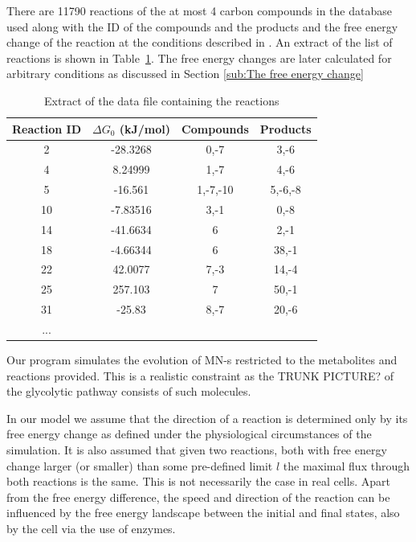 \documentclass[a4paper,12pt]{article}
\begin{document}
	There are 11790 reactions of the at most 4 carbon compounds in the database used along with the ID of the compounds and the products and the free energy change of the reaction at the conditions described in \cite{BartekLower}. An extract of the list of reactions is shown in Table~\ref{tab:reacs}. The free energy changes are later calculated for arbitrary conditions as discussed in Section \ref{sub:The free energy change}

	\begin{table}[htpb]
		\centering
		\begin{tabular}{cccc}
		Reaction ID &	$\Delta G_0$ (kJ/mol) & Compounds & Products \\ \hline
		2 &	-28.3268           & 0,-7      & 3,-6     \\
		4 &	8.24999            & 1,-7      & 4,-6     \\
		5 &	-16.561            & 1,-7,-10  & 5,-6,-8  \\
		10 &	-7.83516           & 3,-1      & 0,-8     \\
		14 &	-41.6634           & 6         & 2,-1     \\
		18 &	-4.66344           & 6         & 38,-1    \\
		22 &	42.0077            & 7,-3      & 14,-4    \\
		25 &	257.103            & 7         & 50,-1    \\
		31 &	-25.83             & 8,-7      & 20,-6    \\
		...&           &         
		\end{tabular}
		\caption{Extract of the data file containing the reactions}
		\label{tab:reacs}
	\end{table}
	
	Our program simulates the evolution of MN-s restricted to the metabolites and reactions provided. This is a realistic constraint as the TRUNK PICTURE? of the glycolytic pathway consists of such molecules.

	In our model we assume that the direction of a reaction is determined only by its free energy change as defined under the physiological circumstances of the simulation. It is also assumed that given two reactions, both with free energy change larger (or smaller) than some pre-defined limit $l$ the maximal flux through both reactions is the same. This is not necessarily the case in real cells. Apart from the free energy difference, the speed and direction of the reaction can be influenced by the free energy landscape between the initial and final states, also by the cell via the use of enzymes. 
\end{document}
